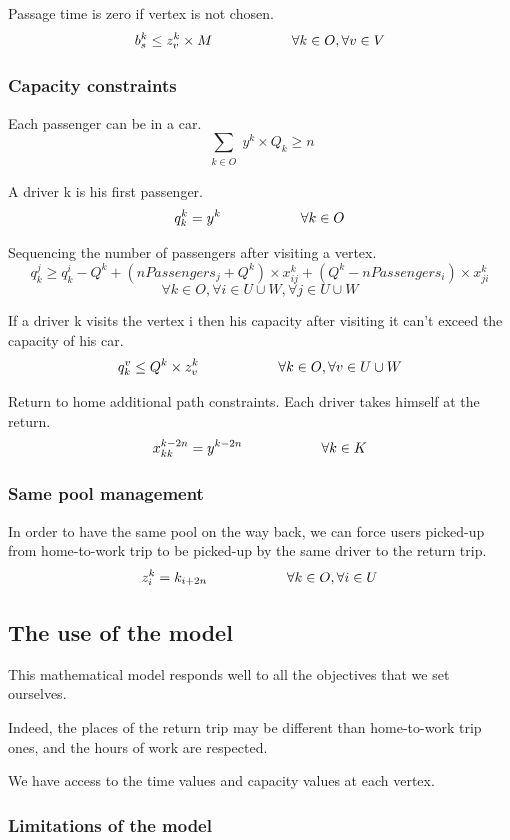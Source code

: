 \documentclass[12pt, a4paper,twoside]{memoir}
\newcommand\tab[1][1cm]{\hspace*{#1}}
\begin{document}
	Passage time is zero if vertex is not chosen.
	\[ b^{k}_{s}\leq z^{k}_{v}\times M \tab \tab \forall k\in O,\forall v\in V \] 
	
	\subsubsection{Capacity constraints}
	
	Each passenger can be in a car. 
	\[ \sum_{\substack{k\in O}}y^{k}\times Q_{k}\geq n \] 
	
	A driver k is his first passenger.
	\[ q_{k}^{k}=y^{k}\tab \tab \forall k\in O \] 
	
	Sequencing the number of passengers after visiting a vertex.
	\[ q_{k}^{j}\ge q_{k}^{i}-Q^{k}+(nPassengers_{j}+Q^{k})\times x^{k}_{ij}+(Q^{k}-nPassengers_{i})\times x^{k}_{ji} \]
	\[ \forall k\in O,\forall i\in U\cup W,\forall j\in U\cup W\]
	
	If a driver k visits the vertex i then his capacity after visiting it can't exceed the capacity of his car.
	\[ q_{k}^{v}\le Q^{k}\times z^{k}_{v}\tab \tab \forall k\in O,\forall v\in U\cup W \] 
	
	Return to home additional path constraints.\newline
	Each driver takes himself at the return.
	\[ x^{k-2n}_{kk}=y^{k-2n} \tab \tab \forall k\in K \] 
	
	\subsubsection{Same pool management}
	
	In order to have the same pool on the way back, we can force users picked-up from home-to-work trip to be picked-up by the same driver to the return trip.
	\[ z^{k}_{i}={k}_{i+2n} \tab \tab \forall k\in O,\forall i\in U \] 

	\subsection{The use of the model}
	
	This mathematical model responds well to all the objectives that we set ourselves.

	Indeed, the places of the return trip may be different than home-to-work trip ones, and the hours of work are respected.
	
	We have access to the time values and capacity values at each vertex.
	
	\subsubsection{Limitations of the model}
	
\end{document}
